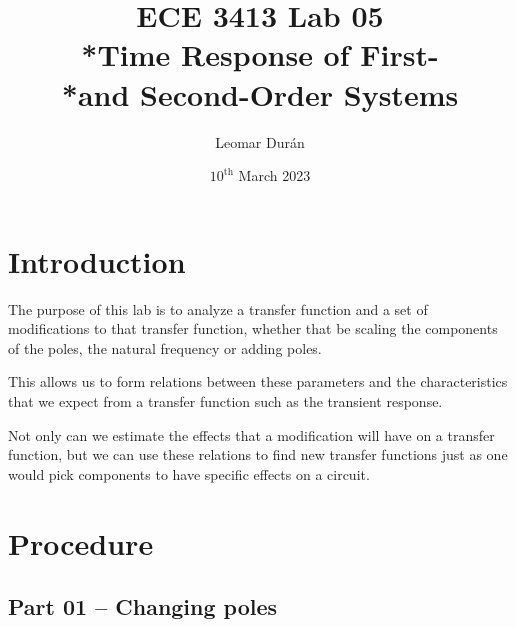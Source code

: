 \documentclass[12pt]{article}
\title{ECE 3413 Lab 05\\*Time Response of First-\\*and Second-Order Systems}
\author{Leomar Dur\'an}
\date{${10}^{\text{th}}$ March 2023}
\begin{document}
\maketitle
\newpage

\section{Introduction}

The purpose of this lab is to analyze a transfer function
and a set of modifications to that transfer function,
whether that be scaling the components of the poles, the natural frequency or adding poles.

This allows us to form relations between these parameters and the characteristics that we expect from a transfer function such as the transient response.

Not only can we estimate the effects that a modification will have on a transfer function, but we can use these relations to find new transfer functions just as one would pick components to have specific effects on a circuit.

\section{Procedure}

\subsection{Part 01 -- Changing poles}\label{ssc:part 01}
\end{document}
